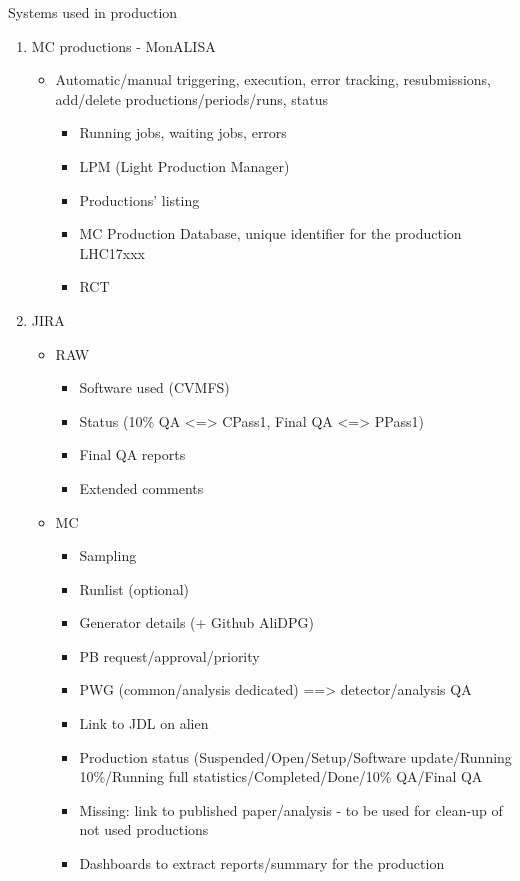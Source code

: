 Systems used in production
\begin{enumerate}
  \item MC productions - MonALISA
  \begin{itemize}
    \item Automatic/manual triggering, execution, error tracking, resubmissions, add/delete productions/periods/runs, status
    \begin{itemize}
      \item Running jobs, waiting jobs, errors
      \item LPM (Light Production Manager)
      \item Productions’ listing
      \item MC Production Database, unique identifier for the production LHC17xxx 
    \item RCT
    \end{itemize}
  \end{itemize}
  \item JIRA
  \begin{itemize}
    \item RAW
    \begin{itemize}
      \item Software used (CVMFS)
      \item Status (10\% QA <=> CPass1, Final QA <=> PPass1)
      \item Final QA reports
      \item Extended comments
    \end{itemize}
    \item MC
    \begin{itemize}
      \item Sampling
      \item Runlist (optional)
      \item Generator details (+ Github AliDPG)
      \item PB request/approval/priority
      \item PWG (common/analysis dedicated) ==> detector/analysis QA
      \item Link to JDL on alien
      \item Production status (Suspended/Open/Setup/Software update/Running 10\%/Running full statistics/Completed/Done/10\% QA/Final QA
      \item Missing: link to published paper/analysis - to be used for clean-up of not used productions
      \item Dashboards to extract reports/summary for the production
      \begin{itemize}

\end{itemize}
\end{itemize}
\end{itemize}
\end{enumerate}
